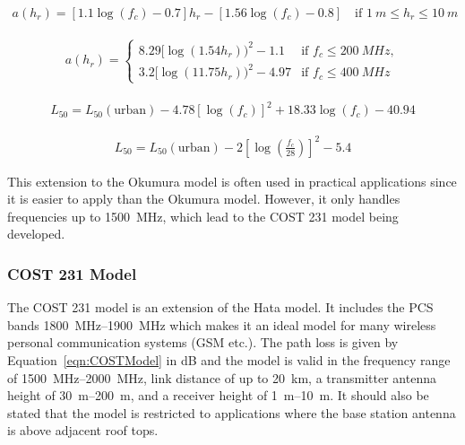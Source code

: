 \begin{align} 
\label{eqn:hataModelahrSmall}
a(h_r) = [1.1 \log(f_c)-0.7]h_r - [1.56 \log(f_c)-0.8]\quad\text{if } \SI{1}{m} \leq h_r \leq \SI{10}{m} 
\end{align} 

\begin{align} 
\label{eqn:hataModelahrLarge}
a(h_r) = 
  \begin{cases}
    8.29[\log(1.54 h_r))^2 -1.1 & \text{if } f_c \leq \SI{200}{MHz}, \\
    3.2[\log(11.75 h_r))^2 -4.97 & \text{if } f_c \leq \SI{400}{MHz} 
  \end{cases}
\end{align} 


\begin{align} 
\label{eqn:hataModelSubUrban}
L_{50} = L_{50}(\text{urban})-4.78[\log(f_c)]^2 + 18.33 \log(f_c) - 40.94 
\end{align} 

\begin{align} 
\label{eqn:hataModelOpen}
L_{50} = L_{50}(\text{urban})-2 \left[\log\left( \frac{f_c}{28} \right) \right]^2 -5.4 
\end{align} 

This extension to the Okumura model is often used in practical applications since it is easier to apply than the Okumura model. However, it only handles frequencies up to \SI{1500}{MHz}, which lead to the COST 231 model being developed. 

\subsubsection{COST 231 Model}
The COST 231 model is an extension of the Hata model. It includes the PCS bands \SIrange{1800}{1900}{MHz} which makes it an ideal model for many wireless personal communication systems (GSM etc.). The path loss is given by Equation~\ref{eqn:COSTModel} in dB\cite{Seybold2005introduction} and the model is valid in the frequency range of  \SIrange{1500}{2000}{MHz}, link distance of up to \SI{20}{km}, a transmitter antenna height of \SIrange{30}{200}{m}, and a receiver height of \SIrange{1}{10}{m}\cite{Seybold2005introduction}. It should also be stated that the model is restricted to applications where the base station antenna is above adjacent roof tops. \cite{itu2002report}

